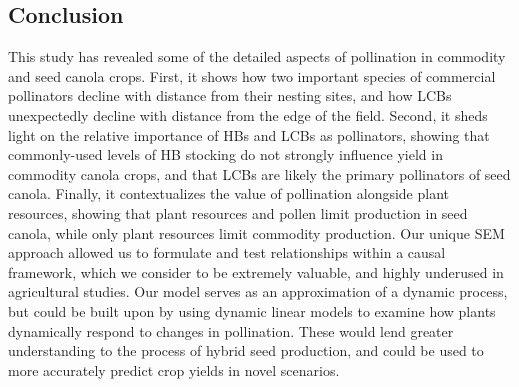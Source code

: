 \documentclass[12pt]{article} %
\begin{document}
\subsection*{Conclusion} 

This study has revealed some of the detailed aspects of pollination in commodity and seed canola crops.
First, it shows how two important species of commercial pollinators decline with distance from their nesting sites, and how LCBs unexpectedly decline with distance from the edge of the field.
Second, it sheds light on the relative importance of HBs and LCBs as pollinators, showing that commonly-used levels of HB stocking do not strongly influence yield in commodity canola crops, and that LCBs are likely the primary pollinators of seed canola.
Finally, it contextualizes the value of pollination alongside plant resources, showing that plant resources and pollen limit production in seed canola, while only plant resources limit commodity production.
Our unique SEM approach allowed us to formulate and test relationships within a causal framework, which we consider to be extremely valuable, and highly underused in agricultural studies.
Our model serves as an approximation of a dynamic process, but could be built upon by using dynamic linear models \citep{iwasa2000, nord2011, saez2018} to examine how plants dynamically respond to changes in pollination.
These would lend greater understanding to the process of hybrid seed production, and could be used to more accurately predict crop yields in novel scenarios.

\end{document}
